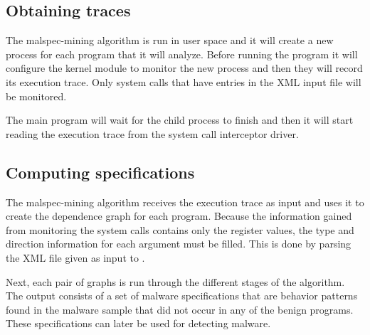 \subsection{Obtaining traces}

The malspec-mining algorithm is run in user space and it will create a new process for each program that it will analyze. Before running the program it will configure the kernel module to monitor the new process and then they will record its execution trace. Only system calls that have entries in the XML input file will be monitored.

The main program will wait for the child process to finish and then it will start reading the execution trace from the system call interceptor driver.

\subsection{Computing specifications}
 
The malspec-mining algorithm receives the execution trace as input and uses it to create the dependence graph for each program. Because the information gained from monitoring the system calls contains only the register values, the type and direction information for each argument must be filled. This is done by parsing the XML file given as input to \project.

Next, each pair of graphs is run through the different stages of the algorithm. The output consists of a set of malware specifications that are behavior patterns found in the malware sample that did not occur in any of the benign programs. These specifications can later be used for detecting malware.
